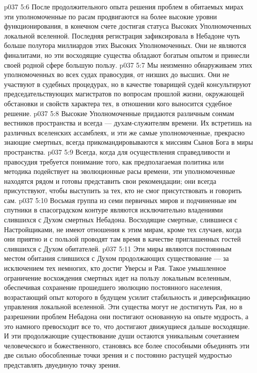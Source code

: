 \vs p037 5:6 После продолжительного опыта решения проблем в обитаемых мирах эти уполномоченные по расам продвигаются на более высокие уровни функционирования, в конечном счете достигая статуса Высоких Уполномоченных локальной вселенной. Последняя регистрация зафиксировала в Небадоне чуть больше полутора миллиардов этих Высоких Уполномоченных. Они не являются финалитами, но эти восходящие существа обладают богатым опытом и принесли своей родной сфере большую пользу.
\vs p037 5:7 Мы неизменно обнаруживаем этих уполномоченных во всех судах правосудия, от низших до высших. Они не участвуют в судебных процедурах, но в качестве товарищей судей консультируют председательствующих магистратов по вопросам прошлой жизни, окружающей обстановки и свойств характера тех, в отношении кого выносится судебное решение.
\vs p037 5:8 Высокие Уполномоченные придаются различным сонмам вестников пространства и всегда --- духам\hyp{}служителям времени. Их встретишь на различных вселенских ассамблеях, и эти же самые уполномоченные, прекрасно знающие смертных, всегда прикомандировываются к миссиям Сынов Бога в миры пространства.
\vs p037 5:9 Всегда, когда для осуществления справедливости и правосудия требуется понимание того, как предполагаемая политика или методика подействует на эволюционные расы времени, эти уполномоченные находятся рядом и готовы представить свои рекомендации; они всегда присутствуют, чтобы выступить за тех, кто не смог присутствовать и говорить сам.
\vs p037 5:10 \pc {} Восьмая группа из семи первичных миров и подчиненные им спутники в спасоградском контуре являются исключительно владениями слившихся с Духом смертных Небадона. Восходящие смертные, слившиеся с Настройщиками, не имеют отношения к этим мирам, кроме тех случаев, когда они приятно и с пользой проводят там время в качестве приглашенных гостей слившихся с Духом обитателей.
\vs p037 5:11 Эти миры являются постоянным местом обитания слившихся с Духом продолжающих существование --- за исключением тех немногих, кто достиг Уверсы и Рая. Такое умышленное ограничение восхождения смертных идет на пользу локальным вселенным, обеспечивая сохранение прошедшего эволюцию постоянного населения, возрастающий опыт которого в будущем усилит стабильность и диверсификацию управления локальной вселенной. Эти существа могут не достигнуть Рая, но в разрешении проблем Небадона они постигают основанную на опыте мудрость, а это намного превосходит все то, что достигают движущиеся дальше восходящие. И эти продолжающие существование души остаются уникальным сочетанием человеческого и божественного, становясь все более способными объединять эти две сильно обособленные точки зрения и с постоянно растущей мудростью представлять двуединую точку зрения.

